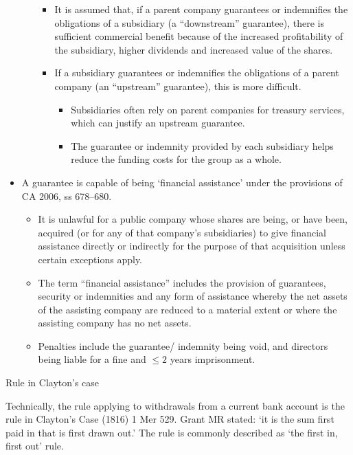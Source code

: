 \documentclass[
]{article}
\providecommand{\tightlist}{%
  \setlength{\itemsep}{0pt}\setlength{\parskip}{0pt}}
\newenvironment{env-f70373ea-d099-4f9a-bab1-dd1716394de8}
{
    \savenotes\tcolorbox[blanker,breakable,left=5pt,borderline west={2pt}{-4pt}{pink}]
}
{
    \endtcolorbox\spewnotes
}
\begin{document}
\begin{itemize}
\begin{itemize}
    \begin{itemize}
    \tightlist
    \item
      It is assumed that, if a parent company guarantees or indemnifies
      the obligations of a subsidiary (a ``downstream'' guarantee),
      there is sufficient commercial benefit because of the increased
      profitability of the subsidiary, higher dividends and increased
      value of the shares.
    \item
      If a subsidiary guarantees or indemnifies the obligations of a
      parent company (an ``upstream'' guarantee), this is more
      difficult.

      \begin{itemize}
      \tightlist
      \item
        Subsidiaries often rely on parent companies for treasury
        services, which can justify an upstream guarantee.
      \item
        The guarantee or indemnity provided by each subsidiary helps
        reduce the funding costs for the group as a whole.
      \end{itemize}
    \end{itemize}
  \end{itemize}
\item
  A guarantee is capable of being `financial assistance' under the
  provisions of CA 2006, ss 678--680.

  \begin{itemize}
  \tightlist
  \item
    It is unlawful for a public company whose shares are being, or have
    been, acquired (or for any of that company's subsidiaries) to give
    financial assistance directly or indirectly for the purpose of that
    acquisition unless certain exceptions apply.
  \item
    The term ``financial assistance'' includes the provision of
    guarantees, security or indemnities and any form of assistance
    whereby the net assets of the assisting company are reduced to a
    material extent or where the assisting company has no net assets.
  \item
    Penalties include the guarantee/ indemnity being void, and directors
    being liable for a fine and {\(\leq 2\)} years imprisonment.
  \end{itemize}
\end{itemize}

\begin{env-f70373ea-d099-4f9a-bab1-dd1716394de8}

Rule in Clayton's case

Technically, the rule applying to withdrawals from a current bank
account is the rule in Clayton's Case (1816) 1 Mer 529. Grant MR stated:
`it is the sum first paid in that is first drawn out.' The rule is
commonly described as `the first in, first out' rule.

\end{env-f70373ea-d099-4f9a-bab1-dd1716394de8}
\end{document}
